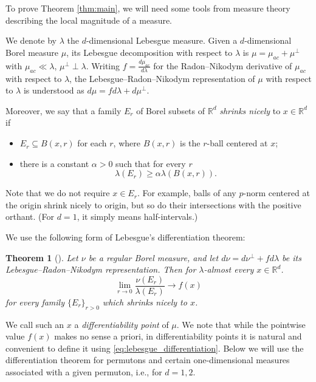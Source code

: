 \documentclass{article}
\newtheorem{theorem}{Theorem}[section]
\theoremstyle{definition}
\begin{document}
To prove Theorem \ref{thm:main}, we will need some tools from measure theory describing the local magnitude of a measure.

We denote by $\lambda$ the $d$-dimensional Lebesgue measure. Given a $d$-dimensional Borel measure $\mu$, its Lebesgue decomposition with respect to $\lambda$ is
$\mu = \mu_{ac}+\mu^{\perp}$ with $\mu_{ac}\ll \lambda$, $\mu^{\perp} \perp \lambda$. Writing $f=\frac{d\mu_{ac}}{d\lambda}$ for the Radon--Nikodym derivative of $\mu_{ac}$ with respect to $\lambda$, the Lebesgue--Radon--Nikodym representation of $\mu$ with respect to $\lambda$ is understood as $d\mu = fd\lambda + d\mu^{\perp}$.

 Moreover, we say that a family $E_r$ of Borel subsets of $\mathbb{R}^d$ \emph{shrinks nicely} to $x\in\mathbb{R}^d$ if
\begin{itemize}
    \item $E_r\subseteq B(x, r)$ for each $r$, where $B(x, r)$ is the $r$-ball centered at $x$;
    \item there is a constant $\alpha>0$ such that for every $r$
    $$\lambda(E_r)\geq \alpha\lambda(B(x, r)).$$
\end{itemize}
Note that we do not require $x\in E_r$. For example, balls of any $p$-norm centered at the origin shrink nicely to origin, but so do their intersections with the positive orthant. (For $d=1$, it simply means half-intervals.) 

We use the following form of Lebesgue's differentiation theorem:

\begin{theorem}[{\cite[Theorem~3.22]{Folland}}]  \label{thm:lebesgue_differentiation}
    Let $\nu$ be a regular Borel measure, and let $d\nu=d\nu^{\perp}+fd\lambda$ be its Lebesgue--Radon--Nikodym representation. Then for $\lambda$-almost every $x\in \mathbb{R}^d$.
    \begin{equation}\label{eq:lebesgue_differentiation}
    \lim_{r\to 0}\frac{\nu(E_r)}{\lambda(E_r)}\to f(x)
    \end{equation}
    for every family $\{E_r\}_{r>0}$ which shrinks nicely to $x$.
\end{theorem}

We call such an $x$ a \emph{differentiability point} of $\mu$. We note that while the pointwise value $f(x)$ makes no sense a priori, in differentiability points it is natural and convenient to define it using \eqref{eq:lebesgue_differentiation}. Below we will use the differentiation theorem for permutons and certain one-dimensional measures associated with a given permuton, i.e., for $d=1, 2$.
\end{document}
